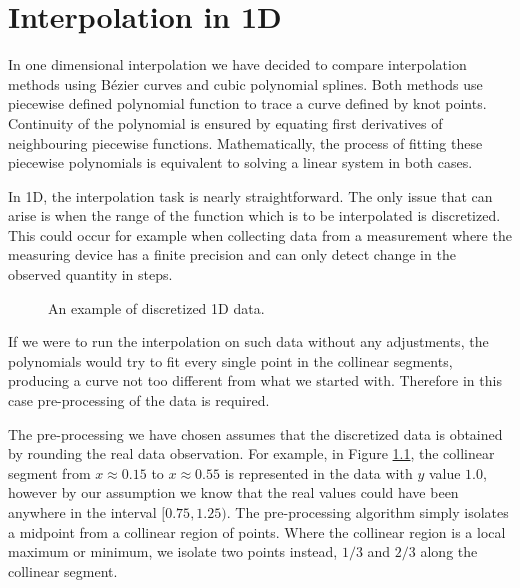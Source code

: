 \documentclass[a4paper,10pt]{report}
\begin{document}
\chapter{Interpolation in 1D}\label{chap:1D}

In one dimensional interpolation we have decided to compare interpolation methods using Bézier curves and cubic polynomial splines. Both methods use piecewise defined polynomial function to trace a curve defined by knot points. Continuity of the polynomial is ensured by equating first derivatives of neighbouring piecewise functions. Mathematically, the process of fitting these piecewise polynomials is equivalent to solving a linear system in both cases.

In 1D, the interpolation task is nearly straightforward. The only issue that can arise is when the range of the function which is to be interpolated is discretized. This could occur for example when collecting data from a measurement where the measuring device has a finite precision and can only detect change in the observed quantity in steps.
\begin{figure}[h]
 \centering
 
 \caption{An example of discretized 1D data.}
 \label{fig:1D_fun}
\end{figure}

If we were to run the interpolation on such data without any adjustments, the polynomials would try to fit every single point in the collinear segments, producing a curve not too different from what we started with. Therefore in this case pre-processing of the data is required.

The pre-processing we have chosen assumes that the discretized data is obtained by rounding the real data observation. For example, in Figure \ref{fig:1D_fun}, the collinear segment from $x\approx0.15$ to $x\approx0.55$ is represented in the data with $y$ value $1.0$, however by our assumption we know that the real values could have been anywhere in the interval $[0.75, 1.25)$. The pre-processing algorithm simply isolates a midpoint from a collinear region of points. Where the collinear region is a local maximum or minimum, we isolate two points instead, $1/3$ and $2/3$ along the collinear segment.
\end{document}
